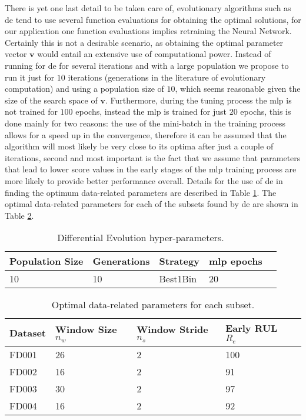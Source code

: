 There is yet one last detail to be taken care of, evolutionary algorithms such as \gls{de} tend to use several function evaluations for obtaining the optimal solutions,  for our application one function evaluations implies retraining the Neural Network. Certainly this is not a desirable scenario, as obtaining the optimal parameter vector $\mathbf{v}$ would entail an extensive use of computational power. Instead of running for \gls{de} for several iterations and with a large population we propose to run it just for $10$ iterations (generations in the literature of evolutionary computation) and using a population size of $10$, which seems reasonable given the size of the search space of $\mathbf{v}$. Furthermore, during the tuning process the \gls{mlp} is not trained for  $100$ epochs, instead the \gls{mlp} is trained for just $20$ epochs, this is done mainly for two reasons: the use of the mini-batch in the training process allows for a speed up in the convergence, therefore it can be assumed that the algorithm will most likely be very close to its optima after just a couple of iterations, second and most important is the fact that we assume that parameters that lead to lower score values in the early stages of the \gls{mlp} training process are more likely to provide better performance overall. Details for the use of \gls{de} in finding the optimum data-related parameters are described in Table \ref{table:de_hyperparams}. The optimal data-related parameters for each of the subsets found by \gls{de} are shown in Table \ref{table:optimal_data_params}.

\begin{table}[!htb]
\centering
\begin{tabular}{l l l l l}
	\hline
	 Population Size & Generations & Strategy & \gls{mlp} epochs\\
  	\hline
  	10 & 10 & Best1Bin & 20\\
  	\hline
\end{tabular}
\caption{Differential Evolution hyper-parameters.}
\label{table:de_hyperparams}
\end{table}

\begin{table}[!htb]
\centering
\begin{tabular}{l l l l l}
	\hline
	 Dataset & Window Size $n_w$ & Window Stride $n_s$ & Early RUL $R_e$\\
  	\hline
  	FD001 & 26 & 2 & 100\\
  	FD002 & 16 & 2 & 91\\
  	FD003 & 30 & 2 & 97\\
  	FD004 & 16 & 2 & 92\\
  	\hline
\end{tabular}
\caption{Optimal data-related parameters for each subset.}
\label{table:optimal_data_params}
\end{table}